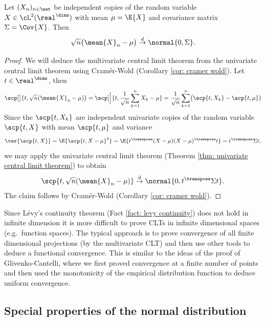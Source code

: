 \begin{mdframed}[innertopmargin=0pt]
\begin{theorem}
    \label{thm: central limit theorem}
    Let \((X_n)_{n\in \nat}\) be independent copies of the random variable
    \(X\in \cL^2(\real^\dims)\) with mean \(\mu = \E{X}\) and covariance matrix
    \(\Sigma = \Cov{X}\). Then
    \[
        \sqrt{n}\bigl(\mean{X}_n - \mu\bigr)
        \overset{d}\to \normal{0, \Sigma}.
    \]
\end{theorem}
\end{mdframed}
\begin{proof}
    We will deduce the multivariate central limit theorem from the univariate
    central limit theorem using Cramér-Wold (Corollary \ref{cor: cramer wold}).
    Let \(t\in \real^\dims\), then
    \[
        \scp[\big]{t, \sqrt{n}(\mean{X}_n - \mu)}
        = \scp[\Big]{t, \frac1{\sqrt{n}} \sum_{k=1}^n X_k - \mu}
        = \frac1{\sqrt{n}}\sum_{k=1}^n \bigl(\scp{t, X_k} - \scp{t, \mu}\bigr)
    \]
    Since the \(\scp{t, X_k}\) are independent univariate copies of the random
    variable \(\scp{t, X}\) with mean \(\scp{t, \mu}\) and variance
    \[
        \var{\scp{t,X}}
        = \E{\scp{t, X - \mu}^2}
        = \E{t^\transpose (X - \mu)(X - \mu)^\transpose t}
        = t^\transpose \Sigma t,
    \]
    we may apply the univariate central limit theorem (Theorem \ref{thm: univariate central limit theorem})
    to obtain
    \[
        \scp{t, \sqrt{n}(\mean{X}_n - \mu)}
        \overset{d}\to \normal{0, t^\transpose \Sigma t}.
    \]
    The claim follows by Cramér-Wold (Corollary \ref{cor: cramer wold}).
\end{proof}

\begin{remark}
    Since Lévy's continuity theorem (Fact \ref{fact: levy continuity}) does
    not hold in infinite dimension it is more difficult to prove CLTs
    in infinite dimensional spaces (e.g.\ function spaces). The typical
    approach is to prove convergence of all finite dimensional projections
    (by the multivariate CLT) and then use other tools to deduce a functional
    convergence. This is similar to the ideas of the proof of Glivenko-Cantelli,
    where we first proved convergence at a finite number of points and then
    used the monotonicity of the empirical distribution function to deduce uniform
    convergence.
\end{remark}


\subsection{Special properties of the normal distribution}

